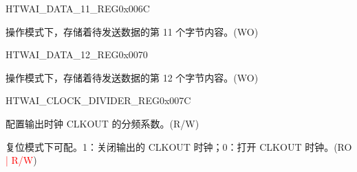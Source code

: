 \begin{register}{H}{TWAI\_DATA\_11\_REG}{0x006C}\label{regdesc:TWAIDATA11REG}
%
%
\regnewline%
\begin{regdesc}\begin{reglist}
\label{fielddesc:TWAITXBYTE11}\item [TWAI\_TX\_BYTE\_11] 操作模式下，存储着待发送数据的第 11 个字节内容。(WO)
\end{reglist}\end{regdesc}
\end{register}


\begin{register}{H}{TWAI\_DATA\_12\_REG}{0x0070}\label{regdesc:TWAIDATA12REG}
%
%
\regnewline%
\begin{regdesc}\begin{reglist}
\label{fielddesc:TWAITXBYTE12}\item [TWAI\_TX\_BYTE\_12] 操作模式下，存储着待发送数据的第 12 个字节内容。(WO)
\end{reglist}\end{regdesc}
\end{register}


\begin{register}{H}{TWAI\_CLOCK\_DIVIDER\_REG}{0x007C}\label{regdesc:TWAICLOCKDIVIDERREG}
%
%
%
\regnewline%
\begin{regdesc}\begin{reglist}
\label{fielddesc:TWAICD}\item [TWAI\_CD] 配置输出时钟 CLKOUT 的分频系数。(R/W)
\label{fielddesc:TWAICLOCKOFF}\item [TWAI\_CLOCK\_OFF] 复位模式下可配。1：关闭输出的 CLKOUT 时钟；0：打开 CLKOUT 时钟。(RO \textcolor{red}{| R/W})
\end{reglist}\end{regdesc}
\end{register}


